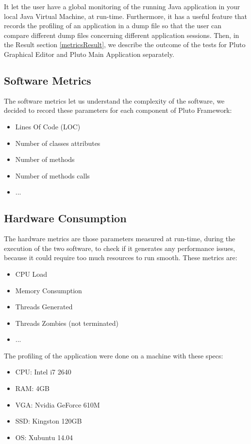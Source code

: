 It let the user have a global monitoring of the running Java application in your local Java Virtual Machine, at run-time. Furthermore, it has a useful feature that records the profiling of an application in a dump file so that the user can compare different dump files concerning different application sessions.
Then, in the Result section \ref{metricsResult}, we describe the outcome of the tests for Pluto Graphical Editor and Pluto Main Application separately.

\subsection{Software Metrics}

The software metrics let us understand the complexity of the software, we decided to record these parameters for each component of Pluto Framework:

\begin{itemize}
\item Lines Of Code (LOC)
\item Number of classes attributes
\item Number of methods
\item Number of methods calls
\item ...
\end{itemize}

\subsection{Hardware Consumption}

The hardware metrics are those parameters measured at run-time, during the execution of the two software, to check if it generates any performance issues, because it could require too much resources to run smooth. These metrics are:

\begin{itemize}
\item CPU Load
\item Memory Consumption
\item Threads Generated
\item Threads Zombies (not terminated)
\item ...
\end{itemize}

The profiling of the application were done on a machine with these specs:

\begin{itemize}
\item CPU: Intel i7 2640
\item RAM: 4GB
\item VGA: Nvidia GeForce 610M
\item SSD: Kingston 120GB
\item OS: Xubuntu 14.04
\end{itemize}

